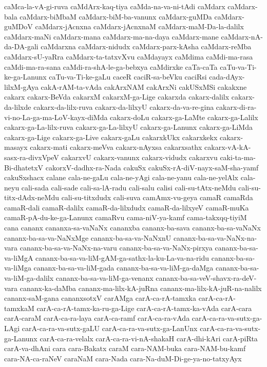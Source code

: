{caMca-la-vA-gi-ruva
caMdArx-kaq-tiya
caMda-na-va-ni-tAdi
caMdarx
caMdarx-bala
caMdarx-biMbaM
caMdarx-biM-ba-vanunx
caMdarx-guMDa
caMdarx-guMDoV
caMdarx-jAcnxna
caMdarx-jAcnxnaM
caMdarx-maM-Da-la-dalilx
caMdarx-maNi
caMdarx-mana
caMdarx-ma-na-daya
caMdarx-mane
caMdarx-nA-da-DA-gali
caMdarxna
caMdarx-nidudx
caMdarx-parx-kAsha
caMdarx-reMba
caMdarx-sU-yaRra
caMdarx-ta-tatxvXvu
caMdayayx
caMdima
caMdi-ma-rasa
caMdi-ma-ra-sana
caMdi-ra-shA-le-ga-bebxya
caMdirxke
caTa-caTa
caTu-va-Ti-ke-ga-Lanunx
caTu-va-Ti-ke-gaLu
caceR
caciR-sa-beVku
caciRsi
cada-dAyx-lilxM-gAya
cakA-rAM-ta-vAda
cakArxNAM
cakArxNi
cakUSxMSi
cakakxne
cakarx
cakarx-BeVda
cakarxM
cakarxM-ga-Lige
cakarxda
cakarx-dalilx
cakarx-da-lilxde
cakarx-da-lilx-ruva
cakarx-da-lilxyU
cakarx-da-va-re-gina
cakarx-di-ra-vi-no-La-ga-ma-LoV-kayx-diMda
cakarx-doLu
cakarx-ga-LaMte
cakarx-ga-Lalilx
cakarx-ga-La-lilx-ruva
cakarx-ga-La-lilxyU
cakarx-ga-Lanunx
cakarx-ga-LiMda
cakarx-ga-Lige
cakarx-ga-Live
cakarx-gaLu
cakarxkUkx
cakarxkekx
cakarx-masayx
cakarx-mati
cakarx-meVva
cakarx-nAyxsa
cakarxsathx
cakarx-vA-kA-sasx-ra-divxVpeV
cakarxvU
cakarx-vanunx
cakarx-vidudx
cakarxvu
caki-ta-ma-Bi-dhatetxV
cakorxV-dadhx-ra-Nada
cakuSx
cakuSx-rA-diV-nayx-saM-sha-yamf
cakuSxshacx
calane
cala-ne-gaLu
cala-ne-yAgi
cala-ne-yanu
cala-ne-yelAlx
cala-neyu
cali-sada
cali-sade
cali-sa-lA-radu
cali-salu
calisi
cali-su-tAtx-neMdu
cali-su-titx-dAdx-neMdu
cali-su-titxdudx
cali-suva
camAmx-vu-geya
camaR
camaRda
camaR-dali
camaR-dalilx
camaR-da-lilxdudx
camaR-da-lilxyeV
camaR-muKa
camaR-pA-du-ke-ga-Lanunx
camaRvu
cama-niV-ya-kamf
cama-takxqq-tiyiM
cana
cananx
cananxa-sa-vaNaNx
cananxba
cananx-ba-sava
cananx-ba-sa-vaNaNx
cananx-ba-sa-va-NaNxMge
cananx-ba-sa-va-NaNxnU
cananx-ba-sa-va-NaNx-na-vara
cananx-ba-sa-va-NaNx-na-varu
cananx-ba-sa-va-NaNx-pirxya
cananx-ba-sa-va-liMgA
cananx-ba-sa-va-liM-gAM-ga-sathx-la-ku-La-va-na-ridu
cananx-ba-sa-va-liMga
cananx-ba-sa-va-liM-gada
cananx-ba-sa-va-liM-ga-daMga
cananx-ba-sa-va-liM-ga-dalilx
cananx-ba-sa-va-liM-ga-venanx
cananx-ba-sa-veV-shavx-ra-deV-vara
cananx-ka-daMba
cananx-ma-lilx-kA-juRna
cananx-ma-lilx-kA-juR-na-nalilx
cananx-saM-gana
cananxsotxV
carAMga
carA-ca-rA-tamxka
carA-ca-rA-tamxkaM
carA-ca-rA-tamx-ka-ru-ga-Lige
carA-ca-rA-tamx-ka-vAda
carA-cara
carA-caraM
carA-ca-ra-laya
carA-ca-ramf
carA-ca-ra-vAda
carA-ca-ra-va-sutx-ga-LAgi
carA-ca-ra-va-sutx-gaLU
carA-ca-ra-va-sutx-ga-LanUnx
carA-ca-ra-va-sutx-ga-Lanunx
carA-ca-ra-velalx
carA-ca-ra-vi-nA-shakaH
carA-dhi-kAri
carA-piRta
carA-va-dhAni
cara
cara-Bakatx
caraM
cara-NAM-buka
cara-NAM-bu-kamf
cara-NA-ca-raNeV
caraNaM
cara-Nada
cara-Na-duM-Di-ge-ya-no-tatxyAyx
}
